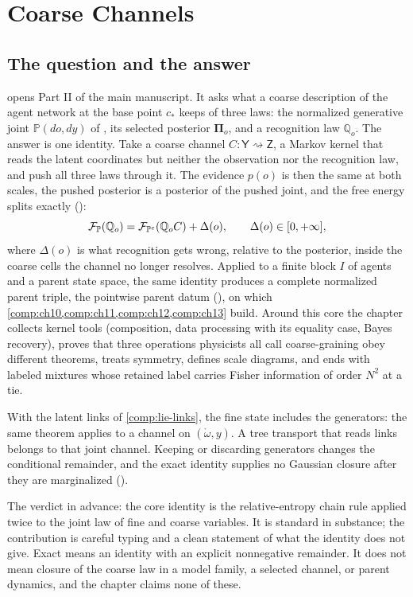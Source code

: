 \chapter{Coarse Channels}
\label{comp:ch09}

\section{The question and the answer}
\label{comp:ch09-question}

 opens Part II of the main manuscript. It asks what a coarse description of the
agent network at the base point $c_*$ keeps of three laws: the normalized generative joint
$\mathbb P(do,dy)$ of , its selected posterior $\boldsymbol\Pi_o$, and a recognition
law $\mathbb Q_o$. The answer is one identity. Take a coarse channel $C:\mathsf Y\rightsquigarrow\mathsf Z$,
a Markov kernel that reads the latent coordinates but neither the observation nor the recognition law,
and push all three laws through it. The evidence $p(o)$ is then the same at both scales, the pushed
posterior is a posterior of the pushed joint, and the free energy splits exactly
():
\[
\mathcal F_{\mathbb P}(\mathbb Q_o)=\mathcal F_{\mathbb P^c}(\mathbb Q_oC)+\Delta(o),
\qquad
\Delta(o)\in[0,+\infty],
\]
where $\Delta(o)$ is what recognition gets wrong, relative to the posterior, inside the coarse cells the
channel no longer resolves. Applied to a finite block $I$ of agents and a parent state space, the same
identity produces a complete normalized parent triple, the pointwise parent datum
(), on which \cref{comp:ch10,comp:ch11,comp:ch12,comp:ch13} build.
Around this core the chapter collects kernel tools (composition, data processing with its equality
case, Bayes recovery), proves that three operations physicists all call coarse-graining obey different
theorems, treats symmetry, defines scale diagrams, and ends with labeled mixtures whose retained label
carries Fisher information of order $N^2$ at a tie.

With the latent links of \cref{comp:lie-links}, the fine state includes the generators:
the same theorem applies to a channel on $(\mathring\omega,y)$. A tree transport that reads links
belongs to that joint channel. Keeping or discarding generators changes the conditional remainder,
and the exact identity supplies no Gaussian closure after they are marginalized
().

The verdict in advance: the core identity is the relative-entropy chain rule applied twice to the joint
law of fine and coarse variables. It is standard in substance; the contribution is careful typing and a
clean statement of what the identity does not give. Exact means an identity with an explicit
nonnegative remainder. It does not mean closure of the coarse law in a model family, a selected
channel, or parent dynamics, and the chapter claims none of these.

